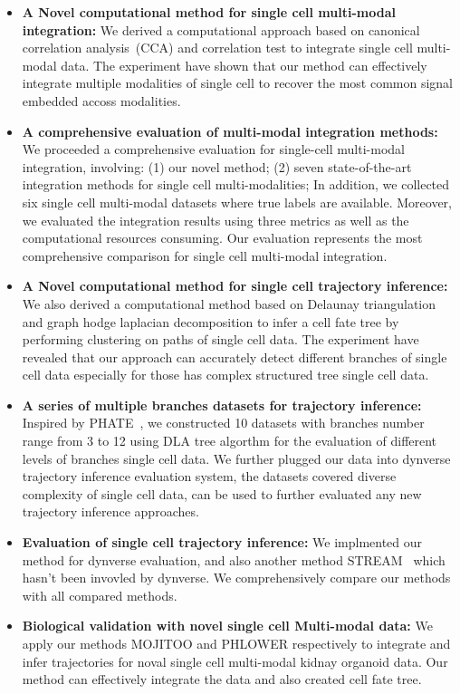 \begin{itemize}
	\item \textbf{A Novel computational method for single cell multi-modal integration:} We derived a computational approach based on canonical correlation analysis~(CCA) and correlation test to integrate single cell multi-modal data. The experiment have shown that our method can effectively integrate multiple modalities of single cell to recover the most common signal embedded accoss modalities.

	\item \textbf{A comprehensive evaluation of multi-modal integration methods:} We proceeded a comprehensive evaluation for single-cell multi-modal integration, involving: (1) our novel method; (2) seven state-of-the-art integration methods for single cell multi-modalities; In addition, we collected six single cell multi-modal datasets where true labels are available. Moreover, we evaluated the integration results using three metrics as well as the computational resources consuming. Our evaluation represents the most comprehensive comparison for single cell multi-modal integration.

	\item \textbf{A Novel computational method for single cell trajectory inference:} We also derived a computational method based on Delaunay triangulation and graph hodge laplacian decomposition to infer a cell fate tree by performing clustering on paths of single cell data. The experiment have revealed that our approach can accurately detect different branches of single cell data especially for those has complex structured tree single cell data.

	\item \textbf{A series of multiple branches datasets for trajectory inference:} Inspired by PHATE~\citep{moon2017phate}, we constructed 10 datasets with branches number range from 3 to 12 using DLA tree algorthm for the evaluation of different levels of branches single cell data. We further plugged our data into dynverse trajectory inference evaluation system, the datasets covered diverse complexity of single cell data, can be used to further evaluated any new trajectory inference approaches.

	\item \textbf{Evaluation of single cell trajectory inference:} We implmented our method for dynverse evaluation, and also another method STREAM~\citep{chen2019stream} which hasn't been invovled by dynverse. We comprehensively compare our methods with all compared methods.

	\item \textbf{Biological validation with novel single cell Multi-modal data:} We apply our methods MOJITOO and PHLOWER respectively to integrate and infer trajectories for noval single cell multi-modal kidnay organoid data. Our method can effectively integrate the data and also created cell fate tree.
\end{itemize}


